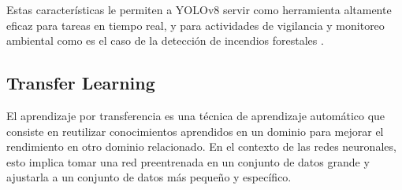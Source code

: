 Estas características le permiten a YOLOv8 servir como herramienta altamente eficaz para
tareas en tiempo real, y para actividades de vigilancia y monitoreo ambiental como es el
caso de la detección de incendios forestales \cite{s23208374}.

\subsection{Transfer Learning}
El aprendizaje por transferencia es una técnica de aprendizaje automático que consiste
en reutilizar conocimientos aprendidos en un dominio para mejorar el rendimiento en otro
dominio relacionado. En el contexto de las redes neuronales, esto implica tomar una red
preentrenada en un conjunto de datos grande y ajustarla a un conjunto de datos más
pequeño y específico.
